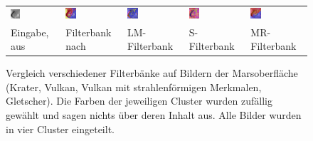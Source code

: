 \begin{figure}[h!]
\begin{tabular}{p{}p{}p{}p{}p{}}
	\includegraphics[width=0.2\textwidth]{images/Gre13/Gre13_05.jpg} &
	\includegraphics[width=0.2\textwidth]{images/gen/filterbanks/Gre13_05.jpg_TSUGF.png} &
	\includegraphics[width=0.2\textwidth]{images/gen/filterbanks/Gre13_05.jpg_LM.png} &
	\includegraphics[width=0.2\textwidth]{images/gen/filterbanks/Gre13_05.jpg_S.png} &
	\includegraphics[width=0.2\textwidth]{images/gen/filterbanks/Gre13_05.jpg_MR.png} \\
	
	\hspace{1pt}\newline\centering Eingabe, aus \cite{greeley_13} &
	\hspace{1pt}\newline\centering Filterbank nach \cite{jain_91} &
	\hspace{1pt}\newline\centering LM-Filterbank \cite{leung_01} &
	\hspace{1pt}\newline\centering S-Filterbank \cite{schmid_01} &
	\hspace{1pt}\newline\centering MR-Filterbank \cite{visgeo} \\
\end{tabular}
\caption{Vergleich verschiedener Filterbänke auf Bildern der Marsoberfläche (Krater, Vulkan, Vulkan mit strahlenförmigen Merkmalen, Gletscher). Die Farben der jeweiligen Cluster wurden zufällig gewählt und sagen nichts über deren Inhalt aus. Alle Bilder wurden in vier Cluster eingeteilt.}
\label{fig:filterbank_comparision}
\end{figure}

